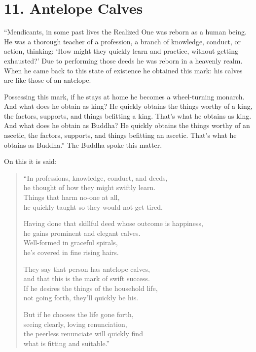 \documentclass[12pt,openany]{book}%
\begin{document}
\section*{11. Antelope Calves }

“Mendicants, in some past lives the Realized One was reborn as a human being. He was a thorough teacher of a profession, a branch of knowledge, conduct, or action, thinking: ‘How might they quickly learn and practice, without getting exhausted?’ Due to performing those deeds he was reborn in a heavenly realm. When he came back to this state of existence he obtained this mark: his calves are like those of an antelope. 

Possessing this mark, if he stays at home he becomes a wheel-turning monarch. And what does he obtain as king? He quickly obtains the things worthy of a king, the factors, supports, and things befitting a king. That’s what he obtains as king. And what does he obtain as Buddha? He quickly obtains the things worthy of an ascetic, the factors, supports, and things befitting an ascetic. That’s what he obtains as Buddha.” The Buddha spoke this matter. 

On this it is said: 

\begin{verse}%
“In professions, knowledge, conduct, and deeds, \\
he thought of how they might swiftly learn. \\
Things that harm no-one at all, \\
he quickly taught so they would not get tired. 

Having done that skillful deed whose outcome is happiness, \\
he gains prominent and elegant calves. \\
Well-formed in graceful spirals, \\
he’s covered in fine rising hairs. 

They say that person has antelope calves, \\
and that this is the mark of swift success. \\
If he desires the things of the household life, \\
not going forth, they’ll quickly be his. 

But if he chooses the life gone forth, \\
seeing clearly, loving renunciation, \\
the peerless renunciate will quickly find \\
what is fitting and suitable.” 

%
\end{verse}
\end{document}
